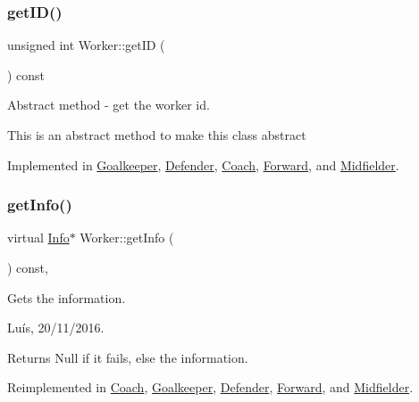 \subsubsection{\texorpdfstring{get\+I\+D()}{getID()}}
{\footnotesize\ttfamily unsigned int Worker\+::get\+ID (\begin{DoxyParamCaption}{ }\end{DoxyParamCaption}) const\hspace{0.3cm}{\ttfamily [pure virtual]}}



Abstract method -\/ get the worker id. 

This is an abstract method to make this class abstract 

Implemented in \hyperlink{class_goalkeeper_a61cff0476146d2fc063d5ed7be82a123}{Goalkeeper}, \hyperlink{class_defender_ad2aadb1cb382bf08522bd858ecc69667}{Defender}, \hyperlink{class_coach_a408361901fdbc11fd990b5fa26a94803}{Coach}, \hyperlink{class_forward_aacec6cafa4f965940286bd81e91e1eed}{Forward}, and \hyperlink{class_midfielder_ac55e51de4a6544c30ef2471b6c160d2b}{Midfielder}.

\hypertarget{class_worker_a95a4f7c750644937859b8e14515a480e}{}\label{class_worker_a95a4f7c750644937859b8e14515a480e} 
\subsubsection{\texorpdfstring{get\+Info()}{getInfo()}}
{\footnotesize\ttfamily virtual \hyperlink{class_info}{Info}$\ast$ Worker\+::get\+Info (\begin{DoxyParamCaption}{ }\end{DoxyParamCaption}) const\hspace{0.3cm}{\ttfamily [inline]}, {\ttfamily [virtual]}}



Gets the information. 

Luís, 20/11/2016. 

\begin{DoxyReturn}{Returns}
Null if it fails, else the information. 
\end{DoxyReturn}


Reimplemented in \hyperlink{class_coach_a527d675556892403695d70c438d76151}{Coach}, \hyperlink{class_goalkeeper_a8636c061d81440070cf554d5a3923acb}{Goalkeeper}, \hyperlink{class_defender_a54de21eac6353f8847ac109b8a08fcab}{Defender}, \hyperlink{class_forward_a5d8e8085c9a8c95a3296afc40fca81e5}{Forward}, and \hyperlink{class_midfielder_a18c2c163951dd942685950ac562f3b24}{Midfielder}.

